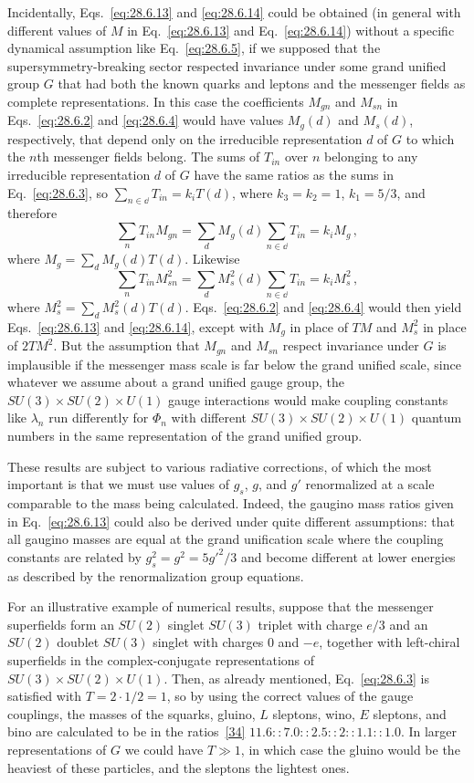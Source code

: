Incidentally, Eqs.~\eqref{eq:28.6.13} and \eqref{eq:28.6.14} could be
obtained (in general with different values of \(M\) in
Eq.~\eqref{eq:28.6.13} and Eq.~\eqref{eq:28.6.14}) without a specific
dynamical assumption like Eq.~\eqref{eq:28.6.5}, if we supposed that the
supersymmetry-breaking sector respected invariance under some grand
unified group \(G\) that had both the known quarks and leptons and the
messenger fields as complete representations. In this case the
coefficients \(M_{gn}\) and \(M_{sn}\) in Eqs.~\eqref{eq:28.6.2} and
\eqref{eq:28.6.4} would have values \(M_g(d)\) and \(M_s(d)\),
respectively, that depend only on the irreducible representation \(d\) of
\(G\) to which the \(n\)th messenger fields belong. The sums of \(T_{in}\)
over \(n\) belonging to any irreducible representation \(d\) of \(G\)
have the same ratios as the sums in Eq.~\eqref{eq:28.6.3}, so
\(\sum_{n\in \dd}T_{in}=k_iT(d)\), where \(k_3=k_2=1\), \(k_1=5/3\), and
therefore
\[
  \sum_nT_{in}M_{gn}
  =\sum_dM_g(d)\sum_{n\in \dd}T_{in}
  =k_iM_g\,,
\]
where \(M_g=\sum_dM_g(d)T(d)\). Likewise
\[
  \sum_nT_{in}M_{sn}^2
  =\sum_dM_s^2(d)\sum_{n\in \dd}T_{in}
  =k_iM_s^2\,,
\]
where \(M_s^2=\sum_dM_s^2(d)T(d)\).
Eqs.~\eqref{eq:28.6.2} and \eqref{eq:28.6.4} would then yield
Eqs.~\eqref{eq:28.6.13} and \eqref{eq:28.6.14}, except with \(M_g\) in
place of \(TM\) and \(M_s^2\) in place of \(2TM^2\). But the assumption
that \(M_{gn}\) and \(M_{sn}\) respect invariance under \(G\) is implausible
if the messenger mass scale is far below the grand unified scale, since
whatever we assume about a grand unified gauge group, the
\(SU(3)\times SU(2)\times U(1)\) gauge interactions would
make coupling constants like \(\lambda_n\) run differently for \(\Phi_n\)
with different \(SU(3)\times SU(2)\times U(1)\) quantum
numbers in the same representation of the grand unified group.

These results are subject to various radiative corrections, of which the
most important is that we must use values of \(g_s\), \(g\), and \(g'\)
renormalized at a scale comparable to the mass being calculated. Indeed,
the gaugino mass ratios given in Eq.~\eqref{eq:28.6.13} could also be
derived under quite different assumptions: that all gaugino masses are
equal at the grand unification scale where the coupling constants are
related by \(g_s^2=g^2=5g'^2/3\) and become different at lower energies
as described by the renormalization group equations.

For an illustrative example of numerical results, suppose that the
messenger superfields form an \(SU(2)\) singlet \(SU(3)\) triplet with
charge \(e/3\) and an \(SU(2)\) doublet \(SU(3)\) singlet with charges 0
and \(-e\), together with left-chiral superfields in the complex-conjugate
representations of \(SU(3)\times SU(2)\times U(1)\).
Then, as already mentioned, Eq.~\eqref{eq:28.6.3} is satisfied with
\(T=2\mathbin{\cdot}1/2=1\), so by using the correct values of the gauge
couplings, the masses of the squarks, gluino, \(L\) sleptons, wino,
\(E\) sleptons, and bino are calculated to be in the
ratios~\hyperref[ch28-ref-34]{[34]}
\(11.6::7.0::2.5::2::1.1::1.0\). In larger representations of \(G\) we
could have \(T\gg1\), in which case the gluino would be the heaviest of
these particles, and the sleptons the lightest ones.


